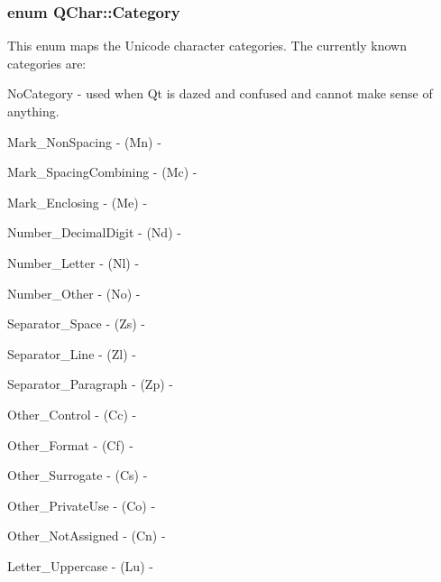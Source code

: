 \subsubsection[{Category}]{\setlength{\rightskip}{0pt plus 5cm}enum {\bf Q\+Char\+::\+Category}}\label{class_q_char_a62908095db0c54f35ff2ae928c621a97}
This enum maps the Unicode character categories. The currently known categories are\+: 
\begin{DoxyItemize}
\item {\ttfamily No\+Category} -\/ used when Qt is dazed and confused and cannot make sense of anything.


\item {\ttfamily Mark\+\_\+\+Non\+Spacing} -\/ (Mn) -\/


\item {\ttfamily Mark\+\_\+\+Spacing\+Combining} -\/ (Mc) -\/


\item {\ttfamily Mark\+\_\+\+Enclosing} -\/ (Me) -\/


\item {\ttfamily Number\+\_\+\+Decimal\+Digit} -\/ (Nd) -\/


\item {\ttfamily Number\+\_\+\+Letter} -\/ (Nl) -\/


\item {\ttfamily Number\+\_\+\+Other} -\/ (No) -\/


\item {\ttfamily Separator\+\_\+\+Space} -\/ (Zs) -\/


\item {\ttfamily Separator\+\_\+\+Line} -\/ (Zl) -\/


\item {\ttfamily Separator\+\_\+\+Paragraph} -\/ (Zp) -\/


\item {\ttfamily Other\+\_\+\+Control} -\/ (Cc) -\/


\item {\ttfamily Other\+\_\+\+Format} -\/ (Cf) -\/


\item {\ttfamily Other\+\_\+\+Surrogate} -\/ (Cs) -\/


\item {\ttfamily Other\+\_\+\+Private\+Use} -\/ (Co) -\/


\item {\ttfamily Other\+\_\+\+Not\+Assigned} -\/ (Cn) -\/


\item {\ttfamily Letter\+\_\+\+Uppercase} -\/ (Lu) -\/



\end{DoxyItemize}
